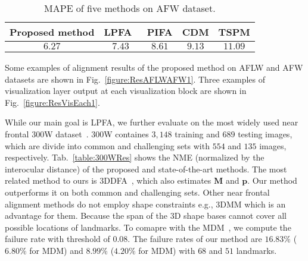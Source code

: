 \begin{table}[t!]\small
\caption{NME ($\%$) of the proposed method at each visualization block on AFLW dataset. The initial NME is 25.8$\%$.}
\vspace{-3mm}
\begin{center}
\end{center}
\label{table:AFLWStage}\vspace{-6mm}
\end{table}








\begin{table}[t!]\small
\caption{MAPE of five methods on AFW dataset.}
\begin{center}
\begin{tabular}{ c|c|c|c|c } 
 \hline
 Proposed method & LPFA~\cite{jourabloo2016large} & PIFA & CDM & TSPM \\ 
 \hline
 $6.27$ & $7.43$ & $8.61$ & $9.13$ & $11.09$ \\
 \hline  
\end{tabular}
\end{center}
\label{table:AFWRes}\vspace{-9mm}
\end{table}
Some examples of alignment results of the proposed method on AFLW and AFW datasets are shown in Fig.~\ref{figure:ResAFLWAFW1}. Three examples of visualization layer output at each visualization block are shown in Fig.~\ref{figure:ResVisEach1}. 

\vspace{-2mm}
\vspace{-2mm}
While our main goal is LPFA, we further evaluate on the most widely used near frontal $300$W dataset~\cite{sagonas2013300}. $300$W containes $3,148$ training and $689$ testing images, which are divide into common and challenging sets with $554$ and $135$ images, respectively. 
Tab.~\ref{table:300WRes} shows the NME (normalized by the interocular distance) of the proposed and state-of-the-art methods. The most related method to ours is $3$DDFA~\cite{zhu2015face}, which also estimates $\textbf{M}$ and $\textbf{p}$. 
Our method outperforms it on both common and challenging sets. Other near frontal alignment methods do not employ shape constraints e.g., $3$DMM which is an advantage for them. Because the span of the $3$D shape bases cannot cover all possible locations of landmarks. 
To comapre with the MDM~\cite{trigeorgis2016mnemonic}, we compute the failure rate with threshold of $0.08$. The failure rates of our method are $16.83\%$ ($6.80\%$ for MDM) and $8.99\%$ ($4.20\%$ for MDM) with $68$ and $51$ landmarks. 

